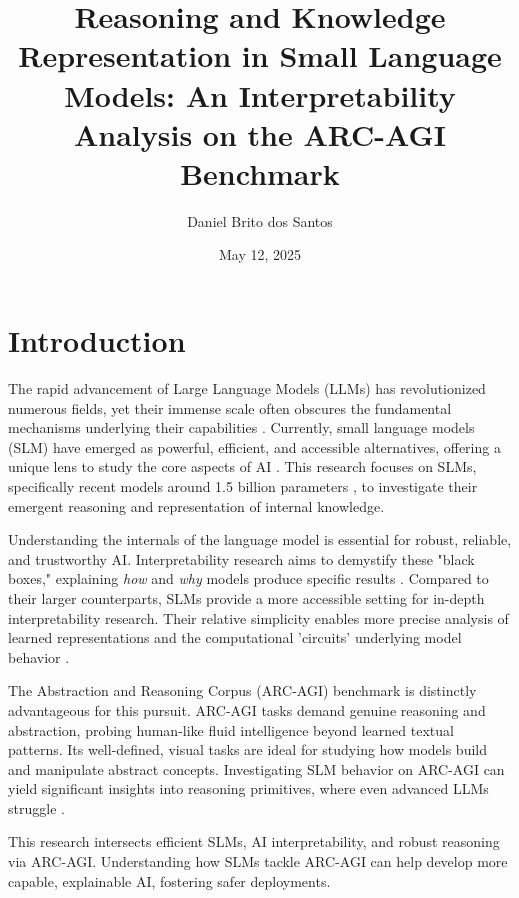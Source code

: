 \documentclass[12pt,a4paper]{article}
\title{
    \textbf{Reasoning and Knowledge Representation in Small Language Models: An Interpretability Analysis on the ARC-AGI Benchmark}
}
\author{Daniel Brito dos Santos}
\date{May 12, 2025}
\begin{document}
\maketitle

\section*{Introduction}

The rapid advancement of Large Language Models (LLMs) has revolutionized numerous fields, yet their immense scale often obscures the fundamental mechanisms underlying their capabilities \parencite{templeton2024scaling}. Currently, small language models (SLM) have emerged as powerful, efficient, and accessible alternatives, offering a unique lens to study the core aspects of AI \parencite{deepseekai2025deepseekr1incentivizingreasoningcapability, qwen2025qwen25technicalreport}. This research focuses on SLMs, specifically recent models around 1.5 billion parameters \parencite{qwen3_blog}, to investigate their emergent reasoning and representation of internal knowledge.

Understanding the internals of the language model is essential for robust, reliable, and trustworthy AI. Interpretability research aims to demystify these "black boxes," explaining \textit{how} and \textit{why} models produce specific results \parencite{doshivelez2017rigorous, amodei2025urgency}. Compared to their larger counterparts, SLMs provide a more accessible setting for in-depth interpretability research. Their relative simplicity enables more precise analysis of learned representations and the computational 'circuits' underlying model behavior \parencite{elhage2021mathematical, olah2020zoom, nanda2023progress, lindsey2025biology}.

The Abstraction and Reasoning Corpus (ARC-AGI) benchmark \parencite{chollet2019measure, arc2024} is distinctly advantageous for this pursuit. ARC-AGI tasks demand genuine reasoning and abstraction, probing human-like fluid intelligence beyond learned textual patterns. Its well-defined, visual tasks are ideal for studying how models build and manipulate abstract concepts. Investigating SLM behavior on ARC-AGI can yield significant insights into reasoning primitives, where even advanced LLMs struggle \parencite{xu2023comprehensive, ichter2023can}.

This research intersects efficient SLMs, AI interpretability, and robust reasoning via ARC-AGI. Understanding how SLMs tackle ARC-AGI can help develop more capable, explainable AI, fostering safer deployments.
\end{document}
